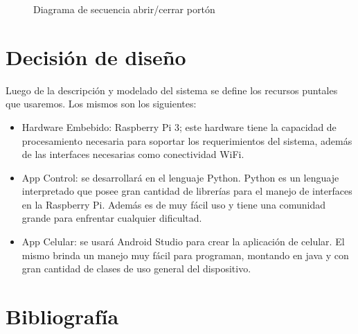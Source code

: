 \documentclass[16pt, article,notitlepage]{article}
\begin{document}
\begin{figure}[H]
	\caption{Diagrama de secuencia abrir/cerrar portón}
\end{figure}

\section{Decisión de diseño}
Luego de la descripción y modelado del sistema se define los recursos puntales que usaremos. Los mismos son los siguientes:

\begin{itemize}
	\item   Hardware Embebido: Raspberry Pi 3; este hardware tiene la capacidad de procesamiento necesaria para soportar los requerimientos del sistema, además de las interfaces necesarias como conectividad WiFi.
	\item App Control: se desarrollará en el lenguaje Python. Python es un lenguaje interpretado que posee gran cantidad de librerías para el manejo de interfaces en la Raspberry Pi. Además es de muy fácil uso y tiene una comunidad grande para enfrentar cualquier dificultad.
	\item   App Celular: se usará Android Studio para crear la aplicación de celular. El mismo brinda un manejo muy fácil para programan, montando en java y con gran cantidad de clases de uso general del dispositivo.
	
\end{itemize}

\section{Bibliografía}



\end{document}
